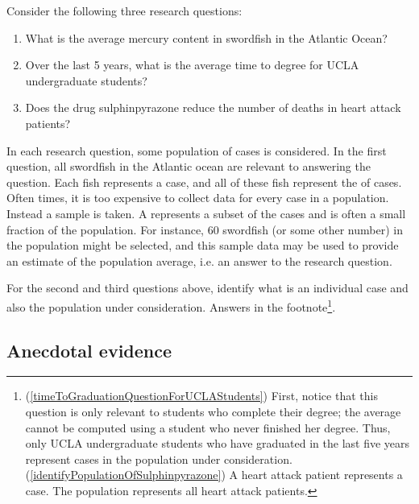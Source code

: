 Consider the following three research questions:
\begin{enumerate}
\setlength{\itemsep}{0mm}
\item What is the average mercury content in swordfish in the Atlantic Ocean?
\item\label{timeToGraduationQuestionForUCLAStudents} Over the last 5 years, what is the average time to degree for UCLA undergraduate students?
\item\label{identifyPopulationOfSulphinpyrazone} Does the drug sulphinpyrazone reduce the number of deaths in heart attack patients?
\end{enumerate}
In each research question, some population of cases is considered. In the first question, all swordfish in the Atlantic ocean are relevant to answering the question. Each fish represents a case, and all of these fish represent the  of cases. Often times, it is too expensive to collect data for every case in a population. Instead a sample is taken. A  represents a subset of the cases and is often a small fraction of the population. For instance, 60 swordfish (or some other number) in the population might be selected, and this sample data may be used to provide an estimate of the population average, i.e. an answer to the research question.

\begin{exercise} \label{identifyingThePopulationForTwoQuestionsInPopAndSampSubsection}
For the second and third questions above, identify what is an individual case and also the population under consideration. Answers in the footnote\footnote{(\ref{timeToGraduationQuestionForUCLAStudents}) First, notice that this question is only relevant to students who complete their degree; the average cannot be computed using a student who never finished her degree. Thus, only UCLA undergraduate students who have graduated in the last five years represent cases in the population under consideration. (\ref{identifyPopulationOfSulphinpyrazone}) A heart attack patient represents a case. The population represents all heart attack patients.}.
\end{exercise}


\subsection{Anecdotal evidence}

